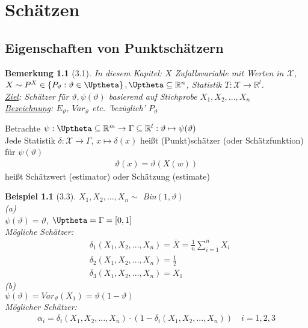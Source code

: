 \documentclass[a4paper,openany]{book}
\theoremstyle{mytheoremstyle}
\newtheorem*{bei}{Beispiel}
\newtheorem*{bem}{Bemerkung}
\theoremstyle{mytheoremstyle2}
\begin{document}
\chapter{Schätzen}
\section{Eigenschaften von Punktschätzern}
\begin{bem}[3.1]
  In diesem Kapitel: $X$ Zufallsvariable mit Werten in $\mathcal{X}$, $X\sim P^X \in \left\{P_{\vartheta }:\vartheta \in \Uptheta\right\}, \Uptheta \subseteq \mathbb{R}^n$, Statistik $T:\mathcal{X}\to \mathbb{R}^l$. \\
  \underline{Ziel}: Schätzer für $\vartheta, \psi (\vartheta ) $ basierend auf Stichprobe $X_1,X_2,...,X_n $  \\
  \underline{Bezeichnung}: $E_{\vartheta }$, $Var_{\vartheta }$ etc. 'bezüglich' $P_\vartheta $
\end{bem}
\begin{defi}{3.2}{}
  Betrachte $\psi :\Uptheta \subseteq \mathbb{R}^m\to\Gamma \subseteq \mathbb{R}^l:\vartheta \mapsto \psi (\vartheta )$ \\
  Jede Statistik $\delta :\mathcal{X}\to \Gamma$, $x \mapsto \delta (x)$ heißt (Punkt)schätzer (oder Schätzfunktion) für $\psi (\vartheta )$   
  \begin{align*}
    \vartheta (x)=\vartheta (X(w))
  \end{align*}
  heißt Schätzwert (estimator) oder Schätzung (estimate)
\end{defi}
\begin{bei}[3.3]
  $X_1,X_2,...,X_n \sim$ Bin$(1,\vartheta )$ \\
  (a) \\
  $\psi (\vartheta )=\vartheta$, $\Uptheta=\Gamma=[0,1]$ \\
  Mögliche Schätzer: 
  \begin{align*}
    &\delta _1(X_1,X_2,...,X_n )=\bar{X}=\frac{1}{n}\sum_{i=1}^{n}{X_i}\\
    &\delta _2(X_1,X_2,...,X_n )=\frac{1}{2}\\
    &\delta _3(X_1,X_2,...,X_n )=X_1
  \end{align*}
  (b)\\
  $\psi (\vartheta )=Var_{\vartheta }(X_1)=\vartheta (1-\vartheta )$ \\
  Möglicher Schätzer: 
  \begin{align*}
    \alpha _i=\delta _i(X_1,X_2,...,X_n )\cdot (1-\delta _i(X_1,X_2,...,X_n ))\quad i=1,2,3
  \end{align*}
\end{bei}
\end{document}
